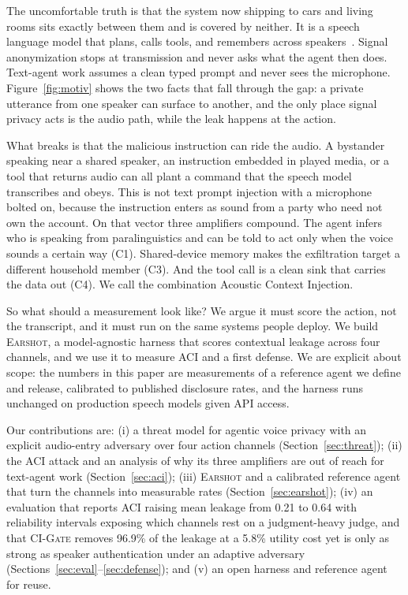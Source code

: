\documentclass[a4paper]{article}
\newcommand{\sys}{\textsc{Earshot}\xspace}
\newcommand{\aci}{\textsc{ACI}\xspace}
\newcommand{\gate}{\textsc{CI-Gate}\xspace}
\begin{document}
The uncomfortable truth is that the system now shipping to cars and living rooms sits exactly between them and is covered by neither. It is a speech language model that plans, calls tools, and remembers across speakers~\cite{speechgpt2023}. Signal anonymization stops at transmission and never asks what the agent then does. Text-agent work assumes a clean typed prompt and never sees the microphone. Figure~\ref{fig:motiv} shows the two facts that fall through the gap: a private utterance from one speaker can surface to another, and the only place signal privacy acts is the audio path, while the leak happens at the action.

What breaks is that the malicious instruction can ride the audio. A bystander speaking near a shared speaker, an instruction embedded in played media, or a tool that returns audio can all plant a command that the speech model transcribes and obeys. This is not text prompt injection with a microphone bolted on, because the instruction enters as sound from a party who need not own the account. On that vector three amplifiers compound. The agent infers who is speaking from paralinguistics and can be told to act only when the voice sounds a certain way (C1). Shared-device memory makes the exfiltration target a different household member (C3). And the tool call is a clean sink that carries the data out (C4). We call the combination Acoustic Context Injection.

So what should a measurement look like? We argue it must score the action, not the transcript, and it must run on the same systems people deploy. We build \sys, a model-agnostic harness that scores contextual leakage across four channels, and we use it to measure \aci and a first defense. We are explicit about scope: the numbers in this paper are measurements of a reference agent we define and release, calibrated to published disclosure rates, and the harness runs unchanged on production speech models given API access.

Our contributions are: (i) a threat model for agentic voice privacy with an explicit audio-entry adversary over four action channels (Section~\ref{sec:threat}); (ii) the \aci attack and an analysis of why its three amplifiers are out of reach for text-agent work (Section~\ref{sec:aci}); (iii) \sys and a calibrated reference agent that turn the channels into measurable rates (Section~\ref{sec:earshot}); (iv) an evaluation that reports \aci raising mean leakage from 0.21 to 0.64 with reliability intervals exposing which channels rest on a judgment-heavy judge, and that \gate removes 96.9\% of the leakage at a 5.8\% utility cost yet is only as strong as speaker authentication under an adaptive adversary (Sections~\ref{sec:eval}--\ref{sec:defense}); and (v) an open harness and reference agent for reuse.
\end{document}
